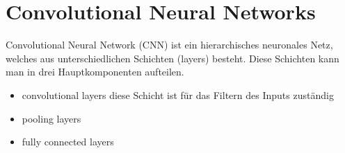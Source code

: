 \chapter{Convolutional Neural Networks}

Convolutional Neural Network (CNN) ist ein hierarchisches neuronales Netz, welches aus unterschiedlichen Schichten (layers) besteht. Diese Schichten kann man in drei Hauptkomponenten aufteilen.\cite{badshah2019deep}
\begin{itemize}
	\item  convolutional layers \newline diese Schicht ist für das Filtern des Inputs zuständig
	\item  pooling layers
	\item  fully connected layers
	
\end{itemize}

